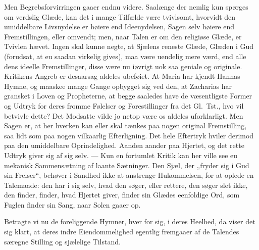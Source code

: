 \documentclass[12pt,a4paper]{book}
\begin{document}
Men Begrebsforvirringen gaaer endnu videre. Saalænge der nemlig kun spørges om
verdslig Glæde, kan det i mange Tilfælde være tvivlsomt, hvorvidt den umiddelbare
Livsnydelse er høiere end Ideenydelsen, Sagen selv høiere end Fremstillingen,
eller omvendt; men, naar Talen er om den religiøse Glæde, er Tvivlen hævet. Ingen
skal kunne negte, at Sjælens reneste Glæde, Glæden i Gud (forudsat, at
eu saadan virkelig gives), maa være uendelig mere værd, end alle dens ideelle
Fremstillinger, disse være nu iøvrigt uok saa geniale og originale. Kritikens
Angreb er desaarsag aldeles ubeføiet. At Maria har kjendt Hannas Hymne,
og maaskee mange Gange opbygget sig ved den, at Zacharias har gransket i Loven og
Propheterne, at begge saaledes have de væsentligste Former og Udtryk for deres
fromme Følelser og Forestillinger fra det Gl.\ Tst., hvo vil betvivle dette? Det
Modsatte vilde jo netop være os aldeles uforklarligt. Men Sagen er, at her
hverken kan eller skal tænkes paa nogen original Fremstilling, saa lidt som paa
nogen vilkaarlig Efterligning. Det hele Eftertryk hviler derimod paa den
umiddelbare Oprindelighed. Aanden aander paa Hjertet, og det rette Udtryk giver
sig af sig selv. --- Kun en fortumlet Kritik kan her ville see eu mekanisk
Sammensætning af laante Sætninger. Den Sjæl, der „fryder sig i Gud sin Frelser“,
behøver i Sandhed ikke at anstrenge Hukommelsen, for at oplede en Talemaade: den
har i sig selv, hvad den søger, eller rettere, den søger slet ikke, den finder,
finder, hvad Hjertet giver, finder sin Glædes eenfoldige Ord, som Fuglen finder
sin Sang, naar Solen gaaer op.

Betragte vi nu de foreliggende Hymner, hver for sig, i deres Heelhed, da viser
det sig klart, at deres indre Eiendommelighed egentlig fremgaaer af de Talendes
særegne Stilling og sjælelige Tilstand.
\end{document}
